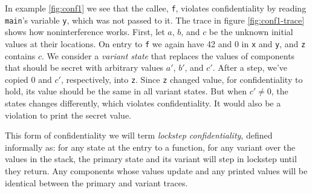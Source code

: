 In example \ref{fig:conf1} we see that the callee, {\tt f}, violates confidentiality
by reading {\tt main}'s variable {\tt y}, which was not passed to it. The trace
in figure \ref{fig:conf1-trace} shows how noninterference works. First, let \(a\),
\(b\), and \(c\) be the unknown initial values at their locations. On entry to {\tt f}
we again have 42 and 0 in {\tt x} and {\tt y}, and {\tt z} contains \(c\). We consider a
{\em variant state} that replaces the values of components that should be secret with
arbitrary values \(a'\), \(b'\), and \(c'\). After a step, we've copied 0 and \(c'\),
respectively, into {\tt z}. Since {\tt z} changed value, for confidentiality to hold,
its value should be the same in all variant states. But when \(c' \not = 0\), the
states changes differently, which violates confidentiality. It would also be a violation
to print the secret value.

This form of confidentiality we will term {\em lockstep confidentiality}, defined informally
as: for any state at the entry to a function, for any variant over the values in the stack,
the primary state and its variant will step in lockstep until they return. Any components
whose values update and any printed values will be identical between the primary and variant
traces.

